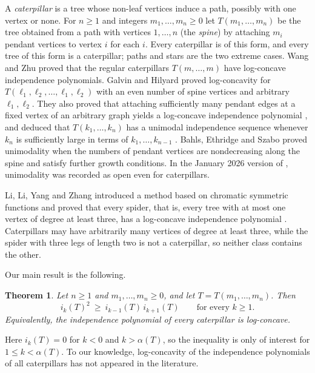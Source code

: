 \documentclass{amsart}
\newtheorem{theorem}{Theorem}[section]
\theoremstyle{definition}
\theoremstyle{remark}
\numberwithin{equation}{section}
\begin{document}
A \emph{caterpillar} is a tree whose non-leaf vertices induce a path, possibly with one vertex or none. For $n\ge1$ and integers $m_1,\dots,m_n\ge0$ let $T(m_1,\dots,m_n)$ be the tree obtained from a path with vertices $1,\dots,n$ (the \emph{spine}) by attaching $m_i$ pendant vertices to vertex $i$ for each $i$. Every caterpillar is of this form, and every tree of this form is a caterpillar; paths and stars are the two extreme cases. Wang and Zhu \cite[Proposition~3.1]{WZ} proved that the regular caterpillars $T(m,\dots,m)$ have log-concave independence polynomials. Galvin and Hilyard \cite[Theorem~1.9(1)]{GaH} proved log-concavity for $T(\ell_1,\ell_2,\dots,\ell_1,\ell_2)$ with an even number of spine vertices and arbitrary $\ell_1,\ell_2$. They also proved that attaching sufficiently many pendant edges at a fixed vertex of an arbitrary graph yields a log-concave independence polynomial \cite[Theorem~1.11]{GaH}, and deduced that $T(k_1,\dots,k_n)$ has a unimodal independence sequence whenever $k_n$ is sufficiently large in terms of $k_1,\dots,k_{n-1}$ \cite[Corollary~1.12]{GaH}. Bahls, Ethridge and Szabo \cite[Theorem~1.1]{BES} proved unimodality when the numbers of pendant vertices are nondecreasing along the spine and satisfy further growth conditions. In the January 2026 version of \cite{Gal26}, unimodality was recorded as open even for caterpillars.

Li, Li, Yang and Zhang \cite{LLYZ} introduced a method based on chromatic symmetric functions and proved that every spider, that is, every tree with at most one vertex of degree at least three, has a log-concave independence polynomial \cite[Theorem~3.1]{LLYZ}. Caterpillars may have arbitrarily many vertices of degree at least three, while the spider with three legs of length two is not a caterpillar, so neither class contains the other.

Our main result is the following.

\begin{theorem}\label{thm:main}
Let $n\ge1$ and $m_1,\dots,m_n\ge0$, and let $T=T(m_1,\dots,m_n)$. Then
\[
i_k(T)^2\ \ge\ i_{k-1}(T)\,i_{k+1}(T)\qquad\text{for every }k\ge1 .
\]
Equivalently, the independence polynomial of every caterpillar is log-concave.
\end{theorem}

Here $i_k(T)=0$ for $k<0$ and $k>\alpha(T)$, so the inequality is only of interest for $1\le k<\alpha(T)$. To our knowledge, log-concavity of the independence polynomials of all caterpillars has not appeared in the literature.
\end{document}
